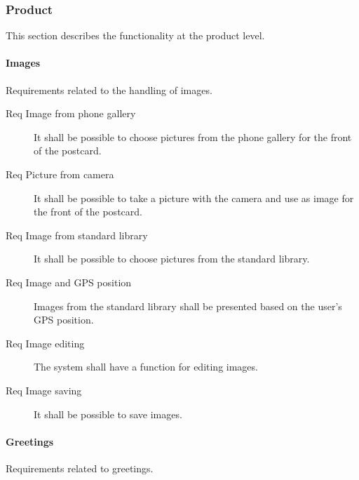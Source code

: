 \documentclass[10pt,a4paper]{article}
\begin{document}
\subsubsection{Product}
This section describes the functionality at the product level. 

\paragraph{Images} 
Requirements related to the handling of images.

\begin {description}
\item [Req  Image from phone gallery]It shall be possible to choose pictures from the phone gallery for the front of the postcard.
\item [Req  Picture from camera] It shall be possible to take a picture with the camera and use as image for the front of the postcard.
\item [Req  Image from standard library] It shall be possible to choose pictures from the standard library.
\item [Req  Image and GPS position] Images from the standard library shall be presented based on the user's GPS position.
\item [Req  Image editing] The system shall have a function for editing images.
\item [Req  Image saving] It shall be possible to save images.
\end{description}

\paragraph{Greetings}
Requirements related to greetings.
\end{document}
